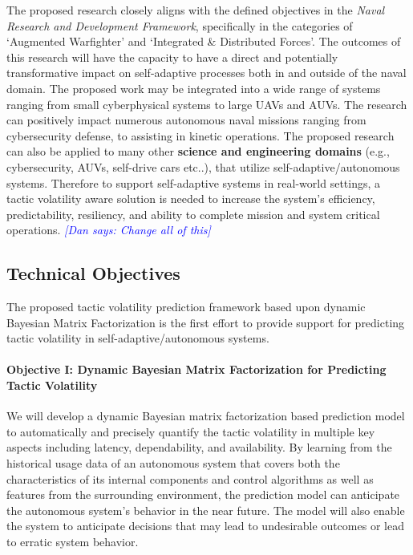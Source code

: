 \documentclass[12pt]{article}
\newcommand{\dan}[1]{\textcolor{blue}{{\it [Dan says: #1]}}}
\begin{document}
The proposed research closely aligns with the defined objectives in the \emph{Naval Research and Development Framework}, specifically in the categories of `Augmented Warfighter' and `Integrated \& Distributed Forces'. The outcomes of this research will have the capacity to have a direct and potentially transformative impact on self-adaptive processes both in and outside of the naval domain. The proposed work may be integrated into a wide range of systems ranging from small cyberphysical systems to large UAVs and AUVs. The research can positively impact numerous autonomous naval missions ranging from cybersecurity defense, to assisting in kinetic operations. The proposed research can also be applied to many other {\bf science and engineering domains} (e.g., cybersecurity, AUVs, self-drive cars etc..), that utilize self-adaptive/autonomous systems. Therefore to support self-adaptive systems in real-world settings, a tactic volatility aware solution is needed to increase the system's efficiency, predictability, resiliency, and ability to complete mission and system critical operations. \dan{Change all of this}


\subsection{Technical Objectives}



The proposed tactic volatility prediction framework based upon dynamic Bayesian Matrix Factorization is the first effort to provide support for predicting tactic volatility in self-adaptive/autonomous systems. %

\vspace{-0mm}\paragraph{Objective I: Dynamic Bayesian Matrix Factorization for Predicting Tactic Volatility } We will develop a dynamic Bayesian matrix factorization based prediction model to automatically and precisely quantify the tactic volatility in multiple key aspects including latency, dependability, and availability. By learning from the historical usage data of an autonomous system that covers both the characteristics of its internal components and control algorithms as well as features from the surrounding environment, the prediction model can anticipate the autonomous system's behavior in the near future. The model will also enable the system to anticipate decisions that may lead to undesirable outcomes or lead to erratic system behavior.
% 
\end{document}
